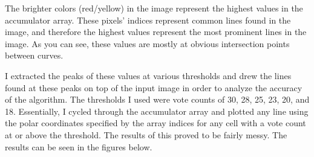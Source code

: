 \documentclass[paper=a4, fontsize=11pt]{scrartcl} %
\numberwithin{equation}{section} %
\numberwithin{figure}{section} %
\numberwithin{table}{section} %
\begin{document}
The brighter colors (red/yellow) in the image represent the highest values in the accumulator array. These pixels' indices represent common lines found in the image, and therefore the highest values represent the most prominent lines in the image. As you can see, these values are mostly at obvious intersection points between curves.

I extracted the peaks of these values at various thresholds and drew the lines found at these peaks on top of the input image in order to analyze the accuracy of the algorithm. The thresholds I used were vote counts of 30, 28, 25, 23, 20, and 18. Essentially, I cycled through the accumulator array and plotted any line using the polar coordinates specified by the array indices for any cell with a vote count at or above the threshold. The results of this proved to be fairly messy. The results can be seen in the figures below.
\end{document}
